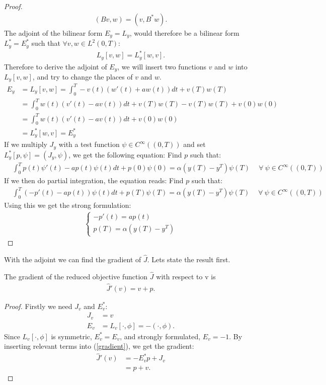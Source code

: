 \begin{proof}
\begin{align*}
(Bv,w)=(v,B^*w).
\end{align*}
The adjoint of the bilinear form $E_y=L_y$, would therefore be a bilinear form $L_y^*=E_y^*$ such that $\forall v,w\in L^2(0,T)$:
\begin{align*}
L_y[v,w]=L_y^*[w,v].
\end{align*}
Therefore to derive the adjoint of $E_y$, we will insert two functions $v$ and $w$ into $L_y[v,w]$, and try to change the places of $v$ and $w$.
\begin{align*}
E_y&=L_y[v,w]=\int_0^T-v(t)(w'(t)+aw(t))dt + v(T)w(T) \\
&=\int_0^Tw(t)(v'(t)-av(t))dt + v(T)w(T)-v(T)w(T) +v(0)w(0) \\
&=\int_0^Tw(t)(v'(t)-a v(t))dt+v(0)w(0) \\
&=L_y^*[w,v]=E_y^*
\end{align*}
If we multiply $J_y$ with a test function $\psi\in C^{\infty}((0,T))$ and set $L_y^*[p,\psi]=(J_y,\psi)$, we get the following equation: Find $p$ such that:
\begin{align*}
&\int_0^Tp(t)\psi'(t)-a p(t)\psi(t)dt + p(0)\psi(0)= \alpha(y(T)-y^T)\psi(T)\ \quad\forall \ \psi \in C^{\infty}((0,T))
\end{align*}
If we then do partial integration, the equation reads: Find $p$ such that:
\begin{align*}
&\int_0^T(-p'(t)-ap(t))\psi(t)dt +p(T)\psi(T)= \alpha(y(T)-y^T)\psi(T)\ \quad\forall \ \psi \in C^{\infty}((0,T))
\end{align*}
Using this we get the strong formulation:
\begin{align*}
   \left\{
     \begin{array}{lr}
       -p'(t) = ap(t) \\
       p(T) = \alpha( y(T)-y^T)
     \end{array}
   \right.
\end{align*}
\end{proof}
With the adjoint we can find the gradient of $\hat{J}$. Lets state the result first.
\begin{theorem}
The gradient of the reduced objective function $\hat{J}$ with respect to v is
\begin{align}
\hat{J}'(v)=v+p. \label{exsample_grad}
\end{align} 
\end{theorem}
\begin{proof}
Firstly we need $J_v$ and $E_v^*$:
\begin{align*}
J_v &= v \\
E_v &= L_v[\cdot,\phi] = -(\cdot,\phi).
\end{align*}
Since $L_v[\cdot,\phi]$ is symmetric, $E_v^*=E_v$, and strongly formulated, $E_v=-1$. By inserting relevant terms into (\ref{gradient}), we get the gradient:
\begin{align*}
\hat{J}'(v)&=-E_v^*p + J_v \\
&= p+v. 
\end{align*} 
\end{proof}
